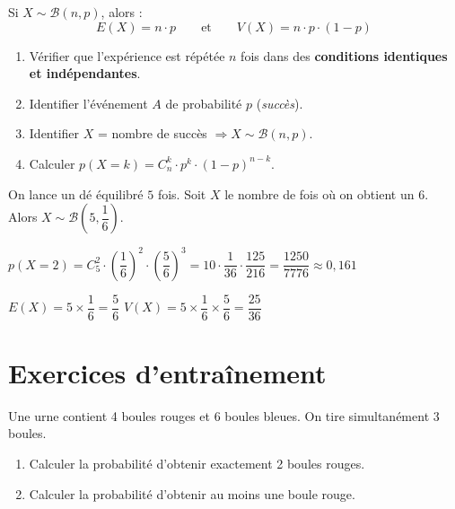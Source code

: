 \begin{propriete}
Si $X \sim \mathcal{B}(n,p)$, alors :
\[
  E(X) = n \cdot p \qquad \text{et} \qquad V(X) = n \cdot p \cdot (1-p)
\]
\end{propriete}

\begin{methode}
\begin{enumerate}[label=\textbf{\arabic*.}, itemsep=3pt]
  \item V\'{e}rifier que l'exp\'{e}rience est r\'{e}p\'{e}t\'{e}e $n$ fois dans des
        \textbf{conditions identiques et ind\'{e}pendantes}.
  \item Identifier l'\'{e}v\'{e}nement $A$ de probabilit\'{e} $p$ (\emph{succ\`{e}s}).
  \item Identifier $X$ = nombre de succ\`{e}s $\Rightarrow X \sim \mathcal{B}(n,p)$.
  \item Calculer $p(X = k) = C_n^k \cdot p^k \cdot (1-p)^{n-k}$.
\end{enumerate}
\end{methode}

\begin{exemple}
On lance un d\'{e} \'{e}quilibr\'{e} $5$ fois. Soit $X$ le nombre de fois o\`{u} on
obtient un $6$. Alors $X \sim \mathcal{B}\!\left(5,\dfrac{1}{6}\right)$.

\medskip
$p(X = 2) = C_5^2 \cdot \left(\dfrac{1}{6}\right)^2 \cdot \left(\dfrac{5}{6}\right)^3
           = 10 \cdot \dfrac{1}{36} \cdot \dfrac{125}{216}
           = \dfrac{1250}{7776} \approx 0{,}161$

\medskip
$E(X) = 5 \times \dfrac{1}{6} = \dfrac{5}{6}$ \qquad
$V(X) = 5 \times \dfrac{1}{6} \times \dfrac{5}{6} = \dfrac{25}{36}$
\end{exemple}

\section{Exercices d'entra\^{i}nement}

\begin{exercice}[1]
Une urne contient 4 boules rouges et 6 boules bleues.
On tire simultan\'{e}ment 3 boules.

\begin{enumerate}[label=\textbf{\arabic*.}, itemsep=4pt]
  \item Calculer la probabilit\'{e} d'obtenir exactement 2 boules rouges.
  \item Calculer la probabilit\'{e} d'obtenir au moins une boule rouge.
\end{enumerate}
\end{exercice}

